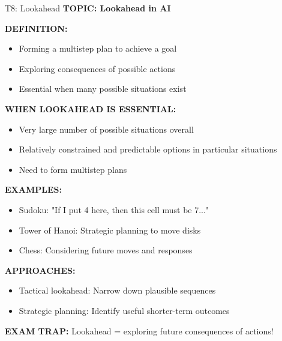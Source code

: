 \documentclass[8pt]{beamer}
\begin{document}
	\begin{frame}{T8: Lookahead}
		\fontsize{6.5}{7.5}\selectfont
		\textbf{TOPIC: Lookahead in AI}
		
		\vspace{0.1cm}
		\textbf{DEFINITION:}
		\begin{itemize}
			\item Forming a multistep plan to achieve a goal
			\item Exploring consequences of possible actions
			\item Essential when many possible situations exist
		\end{itemize}
		
		\vspace{0.1cm}
		\textbf{WHEN LOOKAHEAD IS ESSENTIAL:}
		\begin{itemize}
			\item Very large number of possible situations overall
			\item Relatively constrained and predictable options in particular situations
			\item Need to form multistep plans
		\end{itemize}
		
		\vspace{0.1cm}
		\textbf{EXAMPLES:}
		\begin{itemize}
			\item \textcolor{myblue}{Sudoku:} "If I put 4 here, then this cell must be 7..."
			\item \textcolor{myblue}{Tower of Hanoi:} Strategic planning to move disks
			\item \textcolor{myblue}{Chess:} Considering future moves and responses
		\end{itemize}
		
		\vspace{0.1cm}
		\textbf{APPROACHES:}
		\begin{itemize}
			\item Tactical lookahead: Narrow down plausible sequences
			\item Strategic planning: Identify useful shorter-term outcomes
		\end{itemize}
		
		\textcolor{myred}{\textbf{EXAM TRAP:}} Lookahead = \textcolor{myblue}{exploring future consequences} of actions!
	\end{frame}
	
\end{document}

